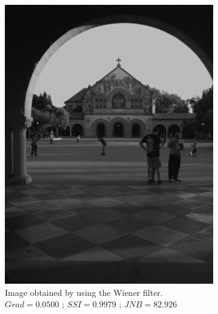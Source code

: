 \begin{figure}[H]
         \vspace{1.5cm}
        \begin{subfigure}[b]{0.35\textwidth}
                        \centering
                        \includegraphics[width=\textwidth]{memchu_wiener_noise.jpg}
                        \caption{Image obtained by using the Wiener filter.\newline $Grad=0.0500$ ; $SSI=0.9979$ ; $JNB=82.926$}
        \end{subfigure}
        \hspace{1cm}
        \begin{subfigure}[b]{0.35\textwidth}
                        \centering

\end{subfigure}
\end{figure}
